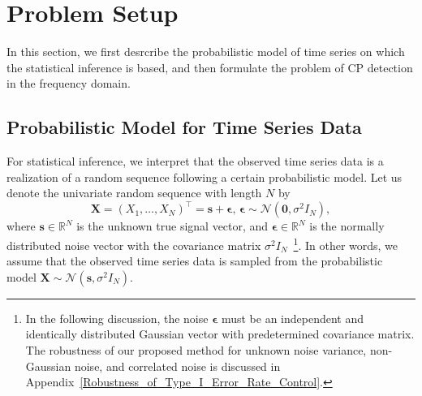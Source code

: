 \section{Problem Setup}
\label{sec:Problem_Setup}

In this section, we first desrcribe the probabilistic model of time series on which the statistical inference is based, 
and then formulate the problem of CP detection in the frequency domain.

\subsection{Probabilistic Model for Time Series Data}
%
For statistical inference, we interpret that the observed time series data is a realization of a random sequence following a certain probabilistic model.
%
Let us denote the univariate random sequence with length $N$ by 
\begin{equation}
  \bm{X} = (X_1, \dots, X_N)^\top = \bm{s} + \bm{\epsilon}, \, \bm{\epsilon} \sim \mathcal{N}(\bm{0}, \sigma^2 I_{N}) \label{signal},  
\end{equation}
where 
$\bm{s} \in \mathbb{R}^N$ is the unknown true signal vector, %
and $\bm{\epsilon} \in \mathbb{R}^N$ is the normally distributed noise vector with the covariance matrix $\sigma^2 I_{N}$~\footnote{
%
In the following discussion, the noise $\bm{\epsilon}$ must be an independent and identically distributed Gaussian vector with predetermined covariance matrix.
%
The robustness of our proposed method for unknown noise variance, non-Gaussian noise, and correlated noise is discussed in Appendix~\ref{Robustness_of_Type_I_Error_Rate_Control}.
}.
%
In other words, we assume that the observed time series data is sampled from the probabilistic model $\bm X \sim \mathcal{N}\left(\bm s, \sigma^2 I_{N} \right)$.

